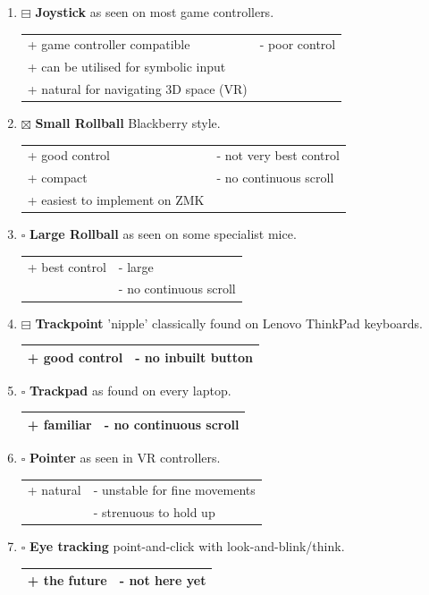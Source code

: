 \documentclass[logo,bsc,singlespacing,parskip]{infthesis}
\begin{document}
\begin{enumerate}
\item{$\boxminus$} \textbf{Joystick} as seen on most game controllers.
\begin{longtable}{|p{6.25cm}|p{6.25cm}|}
\hline
+ game controller compatible & - poor control\\
+ can be utilised for symbolic input & \\
+ natural for navigating 3D space (VR) & \\
\hline
\end{longtable}

\item{$\boxtimes$} \textbf{Small Rollball} Blackberry style.
\begin{longtable}{|p{6.25cm}|p{6.25cm}|}
\hline
+ good control & - not very best control\\
+ compact & - no continuous scroll\\
+ easiest to implement on ZMK & \\
\hline
\end{longtable}

\item{$\square$} \textbf{Large Rollball} as seen on some specialist mice.
\begin{longtable}{|p{6.25cm}|p{6.25cm}|}
\hline
+ best control & - large\\
 & - no continuous scroll\\
\hline
\end{longtable}

\item{$\boxminus$} \textbf{Trackpoint} 'nipple' classically found on Lenovo ThinkPad keyboards.
\begin{longtable}{|p{6.25cm}|p{6.25cm}|}
\hline
+ good control & - no inbuilt button\\
\hline
\end{longtable}

\item{$\square$} \textbf{Trackpad} as found on every laptop.
\begin{longtable}{|p{6.25cm}|p{6.25cm}|}
\hline
+ familiar & - no continuous scroll\\
\hline
\end{longtable}

\item{$\square$} \textbf{Pointer} as seen in VR controllers.
\begin{longtable}{|p{6.25cm}|p{6.25cm}|}
\hline
+ natural & - unstable for fine movements\\
 & - strenuous to hold up\\
\hline
\end{longtable}

\item{$\square$} \textbf{Eye tracking} point-and-click with look-and-blink/think.
\begin{longtable}{|p{6.25cm}|p{6.25cm}|}
\hline
+ the future & - not here yet\\
\hline
\end{longtable}
\end{enumerate}
\end{document}
